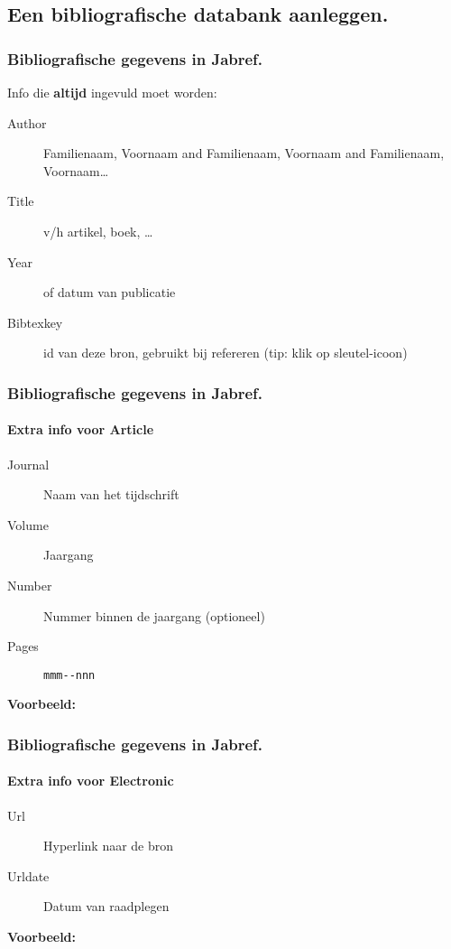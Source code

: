 \documentclass[aspectratio=169]{beamer}
\begin{document}
\subsection{Een bibliografische databank aanleggen.}

\begin{frame}
  \frametitle{Bibliografische gegevens in Jabref.}

  Info die \textbf{altijd} ingevuld moet worden:

  \begin{description}
    \item[Author] Familienaam, Voornaam and Familienaam, Voornaam and Familienaam, Voornaam\ldots
    \item[Title] v/h artikel, boek, \ldots
    \item[Year] of datum van publicatie
    \item[Bibtexkey] id van deze bron, gebruikt bij refereren (tip: klik op sleutel-icoon)
  \end{description}
\end{frame}

\begin{frame}[fragile]
  \frametitle{Bibliografische gegevens in Jabref.}
  \framesubtitle{Extra info voor Article}

  \begin{description}
    \item[Journal] Naam van het tijdschrift
    \item[Volume] Jaargang
    \item[Number] Nummer binnen de jaargang (optioneel)
    \item[Pages] \verb|mmm--nnn|
  \end{description}

  \bigskip

  \textbf{Voorbeeld:}

  \bigskip

\end{frame}

\begin{frame}[plain]
  \frametitle{Bibliografische gegevens in Jabref.}
  \framesubtitle{Extra info voor Electronic}

  \begin{description}
    \item[Url] Hyperlink naar de bron
    \item[Urldate] Datum van raadplegen
  \end{description}

  \bigskip

  \textbf{Voorbeeld:}

  \bigskip


\end{frame}
\end{document}
